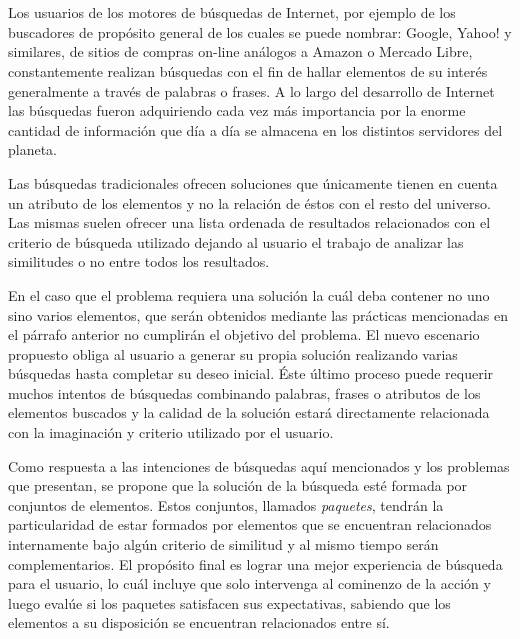 \chapter*{\runtitulo}

\noindent 

Los usuarios de los motores de búsquedas de Internet, por ejemplo de los buscadores de propósito general de los cuales se puede nombrar: Google, Yahoo! y similares, de sitios de compras on-line análogos a Amazon o Mercado Libre, constantemente realizan búsquedas con el fin de hallar elementos de su interés generalmente a través de palabras o frases. A lo largo del desarrollo de Internet las búsquedas fueron adquiriendo cada vez más importancia por la enorme cantidad de información que día a día se almacena en los distintos servidores del planeta.

Las búsquedas tradicionales ofrecen soluciones que únicamente tienen en cuenta un atributo de los elementos y no la relación de éstos con el resto del universo. Las mismas suelen ofrecer una lista ordenada de resultados relacionados con el criterio de búsqueda utilizado dejando al usuario el trabajo de analizar las similitudes o no entre todos los resultados.

En el caso que el problema requiera una solución la cuál deba contener no uno sino varios elementos, que serán obtenidos mediante las prácticas mencionadas en el párrafo anterior no cumplirán el objetivo del problema. El nuevo escenario propuesto obliga al usuario a generar su propia solución realizando varias búsquedas hasta completar su deseo inicial. Éste último proceso puede requerir muchos intentos de búsquedas combinando palabras, frases o atributos de los elementos buscados y la calidad de la solución estará directamente relacionada con la imaginación y criterio utilizado por el usuario.

Como respuesta a las intenciones de búsquedas aquí mencionados y los problemas que presentan, se propone que la solución de la búsqueda esté formada por conjuntos de elementos. Estos conjuntos, llamados {\em paquetes}, tendrán la particularidad de estar formados por elementos que se encuentran relacionados internamente bajo algún criterio de similitud y al mismo tiempo serán complementarios. El propósito final es lograr una mejor experiencia de búsqueda para el usuario, lo cuál incluye que solo intervenga al cominenzo de la acción y luego evalúe si los paquetes satisfacen sus expectativas, sabiendo que los elementos a su disposición se encuentran relacionados entre sí.


